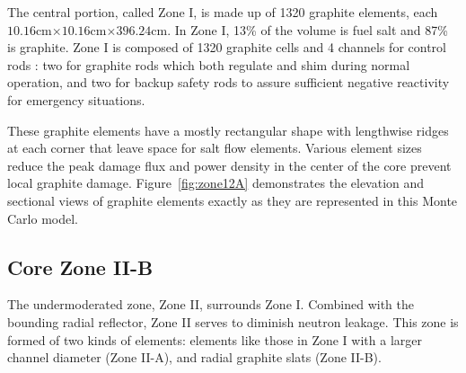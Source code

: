 \documentclass{anstrans}
\begin{document}
The central portion, called Zone I, is made up of 1320 graphite elements, each 
$10.16$cm$\times10.16$cm$\times396.24$cm.
In Zone I, 13\% of the volume is fuel salt and 87\% is graphite. Zone I is 
composed of 1320 graphite cells and 4 channels for control rods : two for 
graphite rods which both regulate and shim during normal operation, and two
for backup safety rods to assure sufficient negative reactivity for emergency 
situations.

These graphite elements have a mostly rectangular shape with lengthwise ridges 
at each corner that leave space for salt flow elements. Various element sizes 
reduce the peak damage flux and power density in the center of the core prevent 
local graphite damage. Figure~\ref{fig:zone12A} demonstrates the elevation and 
sectional views of graphite elements exactly as they are represented in this 
Monte Carlo model.

\subsection{Core Zone II-B}

The undermoderated zone, Zone II, surrounds Zone I.
Combined with the bounding radial reflector, Zone II serves to diminish neutron 
leakage. This zone is formed of two kinds of elements: elements like those in 
Zone I with a larger channel diameter (Zone II-A), and radial
graphite slats (Zone II-B). 
\end{document}
